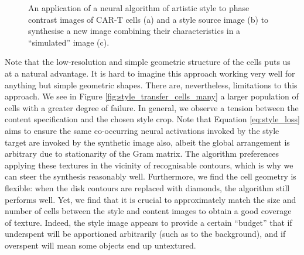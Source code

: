\begin{figure}[hb]%
    \centering
    \qquad
    \qquad
    \caption{An application of a neural algorithm of artistic style to phase contrast images of CAR-T cells (a) and a style source image (b) to synthesise a new image combining their characteristics in a ``simulated'' image (c).}%
    \label{fig:style_transfer_cells}
\end{figure}

Note that the low-resolution and simple geometric structure of the cells puts us at a natural advantage. It is hard to imagine this approach working very well for anything but simple geometric shapes. There are, nevertheless, limitations to this approach. We see in Figure \ref{fig:style_transfer_cells_many} a larger population of cells with a greater degree of failure. In general, we observe a tension between the content specification and the chosen style crop. Note that Equation \ref{eq:style_loss} aims to ensure the same co-occurring neural activations invoked by the style target are invoked by the synthetic image also, albeit the global arrangement is arbitrary due to stationarity of the Gram matrix. The algorithm preferences applying these textures in the vicinity of recognisable contours, which is why we can steer the synthesis reasonably well. Furthermore, we find the cell geometry is flexible: when the disk contours are replaced with diamonds, the algorithm still performs well. Yet, we find that it is crucial to approximately match the size and number of cells between the style and content images to obtain a good coverage of texture. Indeed, the style image appears to provide a certain ``budget'' that if underspent will be apportioned arbitrarily (such as to the background), and if overspent will mean some objects end up untextured.

